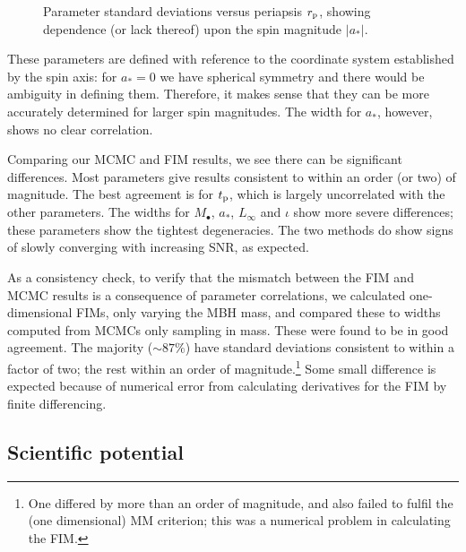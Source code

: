 \begin{figure}
\caption{Parameter standard deviations versus periapsis $r_\mathrm{p}$, showing dependence (or lack thereof) upon the spin magnitude $|a_\ast|$.}
\label{fig:sigmas-spin}
\end{figure}
These parameters are defined with reference to the coordinate system established by the spin axis: for $a_\ast = 0$ we have spherical symmetry and there would be ambiguity in defining them. Therefore, it makes sense that they can be more accurately determined for larger spin magnitudes. The width for $a_\ast$, however, shows no clear correlation.

Comparing our MCMC and FIM results, we see there can be significant differences. Most parameters give results consistent to within an order (or two) of magnitude. The best agreement is for $t_\mathrm{p}$, which is largely uncorrelated with the other parameters. The widths for $M_\bullet$, $a_\ast$, $L_\infty$ and $\iota$ show more severe differences; these parameters show the tightest degeneracies. The two methods do show signs of slowly converging with increasing SNR, as expected.

As a consistency check, to verify that the mismatch between the FIM and MCMC results is a consequence of parameter correlations, we calculated one-dimensional FIMs, only varying the MBH mass, and compared these to widths computed from MCMCs only sampling in mass. These were found to be in good agreement. The majority ($\sim 87\%$) have standard deviations consistent to within a factor of two; the rest within an order of magnitude.\footnote{One differed by more than an order of magnitude, and also failed to fulfil the (one dimensional) MM criterion; this was a numerical problem in calculating the FIM.} Some small difference is expected because of numerical error from calculating derivatives for the FIM by finite differencing.

\subsection{Scientific potential}

